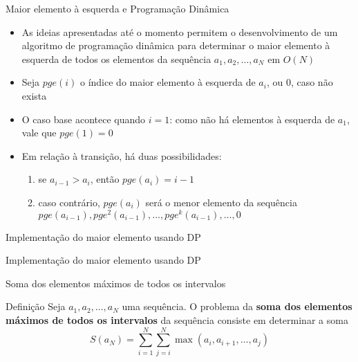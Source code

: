 \begin{frame}[fragile]{Maior elemento à esquerda e Programação Dinâmica}

    \begin{itemize}
        \item As ideias apresentadas até o momento permitem o desenvolvimento de um algoritmo de 
            programação dinâmica para determinar o maior elemento à esquerda de todos os elementos
            da sequência $a_1, a_2, \ldots, a_N$ em $O(N)$

        \item Seja $pge(i)$ o índice do maior elemento à esquerda de $a_i$, ou $0$, caso não exista

        \item O caso base acontece quando $i = 1$: como não há elementos à esquerda de $a_1$, vale que
            $pge(1) = 0$

        \item Em relação à transição, há duas possibilidades:
            \begin{enumerate}
                \item se $a_{i - 1} > a_i$, então $pge(a_i) = i - 1$
                \item caso contrário, $pge(a_i)$ será o menor elemento da sequência $pge(a_{i - 1}), 
                    pge^2(a_{i - 1}), \ldots, pge^k(a_{i - 1}), \ldots, 0$
            \end{enumerate}
    \end{itemize}
\end{frame}

\begin{frame}[fragile]{Implementação do maior elemento usando DP}
\end{frame}

\begin{frame}[fragile]{Implementação do maior elemento usando DP}
\end{frame}

\begin{frame}[fragile]{Soma dos elementos máximos de todos os intervalos}

    \begin{block}{Definição}
        Seja $a_1, a_2, \ldots, a_N$ uma sequência. O problema da \textbf{soma dos elementos máximos
            de todos os intervalos} da sequência consiste em determinar a soma
        $$
            S(a_N) = \sum_{i = 1}^N\sum_{j = i}^N \max(a_i, a_{i+1}, \ldots, a_j)
        $$
    \end{block}
\end{frame}

